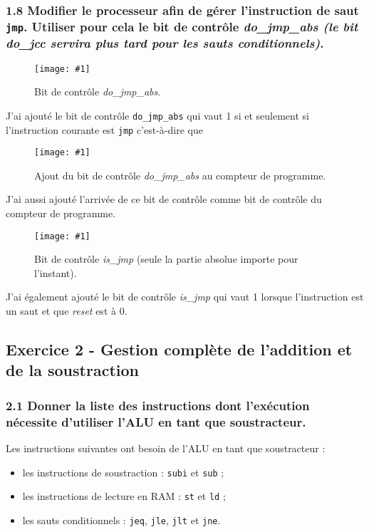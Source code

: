 \documentclass[twoside, 12pt, a4paper]{article}
\newcommand{\cf}[3]{
    \begin{figure}[!h]
        \centering
        \texttt{[image: \#1]}
    \caption{#3}\label{Fig:#1}
    \end{figure}
}
\newcommand{\hcf}[2]{\cf{#1}{.75}{#2}}
\begin{document}
\clearpage
        
        \subsubsection*{\textbf{1.8} Modifier le processeur afin de gérer l'instruction de saut \texttt{jmp}. Utiliser pour cela le bit de contrôle \textit{do\_jmp\_abs (le bit \textit{do\_jcc} servira plus tard pour les sauts conditionnels)}.}

        \hcf{do_jmp_abs.png}{Bit de contrôle \textit{do\_jmp\_abs}.}
        
        J'ai ajouté le bit de contrôle \texttt{do\_jmp\_abs} qui vaut 1 si et seulement si l'instruction courante est \texttt{jmp} c'est-à-dire que 

        \hcf{clock_abs.png}{Ajout du bit de contrôle \textit{do\_jmp\_abs} au compteur de programme.}

        J'ai aussi ajouté l'arrivée de ce bit de contrôle comme bit de contrôle du compteur de programme.

        \hcf{is_jmp.png}{Bit de contrôle \textit{is\_jmp} (seule la partie absolue importe pour l'instant).}
        
        J'ai également ajouté le bit de contrôle \textit{is\_jmp} qui vaut 1 lorsque l'instruction est un saut et que \textit{reset} est à 0.


\newpage

        \subsection{Exercice 2 - Gestion complète de l'addition et de la soustraction}

        \subsubsection*{\textbf{2.1} Donner la liste des instructions dont l'exécution nécessite d'utiliser l'ALU en tant que soustracteur.}

    Les instructions suivantes ont besoin de l'ALU en tant que soustracteur :
    \begin{itemize}[nosep]
        \item les instructions de soustraction : \texttt{subi} et \texttt{sub} ;
        \item les instructions de lecture en RAM : \texttt{st} et \texttt{ld} ;
        \item les sauts conditionnels : \texttt{jeq}, \texttt{jle}, \texttt{jlt} et \texttt{jne}.
    \end{itemize}
    
\end{document}
